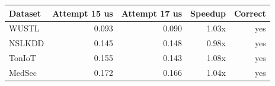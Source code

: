 \begin{tabular}{lrrrr}
\toprule
Dataset & Attempt 15 us & Attempt 17 us & Speedup & Correct \\
\midrule
WUSTL & 0.093 & 0.090 & 1.03x & yes \\
NSLKDD & 0.145 & 0.148 & 0.98x & yes \\
TonIoT & 0.155 & 0.143 & 1.08x & yes \\
MedSec & 0.172 & 0.166 & 1.04x & yes \\
\bottomrule
\end{tabular}
